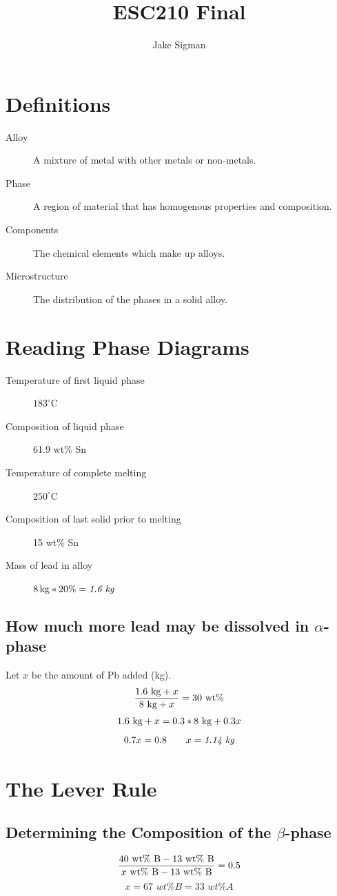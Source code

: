 \documentclass{article}
\title{ESC210 Final}
\author{Jake Sigman}
\date{}
\begin{document}
\section*{Definitions}

\begin{description}
    \item[Alloy] A mixture of metal with other metals or non-metals.
    \item[Phase] A region of material that has homogenous properties and composition.
    \item[Components] The chemical elements which make up alloys.
    \item[Microstructure] The distribution of the phases in a solid alloy.
\end{description}

\section*{Reading Phase Diagrams}

\begin{description}
    \item[Temperature of first liquid phase] \(183^\circ\)C
    \item[Composition of liquid phase] 61.9 wt\% Sn
    \item[Temperature of complete melting] \(250^\circ\)C
    \item[Composition of last solid prior to melting] 15 wt\% Sn
    \item[Mass of lead in alloy] \(8\,\textnormal{kg} * 20\%=\textit{1.6 kg}\)
\end{description}
\subsection*{How much more lead may be dissolved in \(\alpha\)-phase}
Let \(x\) be the amount of Pb added (kg).
\[\frac{1.6 \textnormal{ kg}+x}{8 \textnormal{ kg}+x}=30 \textnormal{ wt\%}\]
\[1.6 \textnormal{ kg}+x=0.3*8\textnormal{ kg}+0.3x\]
\[0.7x=0.8\hspace{7 mm}x=\textit{1.14 kg}\]

\section*{The Lever Rule}
\subsection*{Determining the Composition of the \(\beta\)-phase}
\[\frac{40 \textnormal{ wt\% B}-13 \textnormal{ wt\% B}}{x \textnormal{ wt\% B}-13 \textnormal{ wt\% B}}=0.5\]
\[x=\textit{67 wt\% B}=\textit{33 wt\% A}\]
\end{document}

